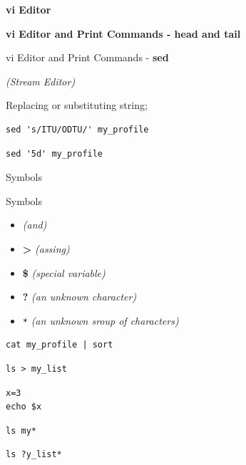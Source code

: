 \documentclass[ignorenonframetext,]{beamer}
\providecommand{\tightlist}{%
  \setlength{\itemsep}{0pt}\setlength{\parskip}{0pt}}
\begin{document}
\begin{frame}[fragile]{\textbf{vi Editor}}
\begin{block}{\textbf{vi Editor and Print Commands - {\textbf{head}} and
{\textbf{tail}}}}
\end{block}

\begin{block}{vi Editor and Print Commands - {\textbf{sed}}}

\emph{(Stream Editor)}

Replacing or substituting string;

\begin{verbatim}
sed 's/ITU/ODTU/' my_profile
\end{verbatim}

\begin{verbatim}
sed '5d' my_profile 
\end{verbatim}

\end{block}

\end{frame}

\begin{frame}[fragile]{Symbols}

\begin{block}{Symbols}

\begin{itemize}
\tightlist
\item
  {\textbf{\textbar{}}} \emph{(and)}
\item
  {\textbf{\textgreater{}}} \emph{(assing)}
\item
  {\textbf{\$}} \emph{(special variable)}
\item
  {\textbf{?}} \emph{(an unknown character)}
\item
  {\texttt{*}} \emph{(an unknown sroup of characters)}
\end{itemize}

\begin{verbatim}
cat my_profile | sort
\end{verbatim}

\begin{verbatim}
ls > my_list
\end{verbatim}

\begin{verbatim}
x=3
echo $x
\end{verbatim}

\begin{verbatim}
ls my*
\end{verbatim}

\begin{verbatim}
ls ?y_list* 
\end{verbatim}

\end{block}

\end{frame}
\end{document}
